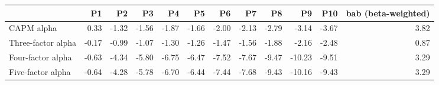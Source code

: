 \begin{tabular}{lrrrrrrrrrrr}
\toprule
{} &    P1 &    P2 &    P3 &    P4 &    P5 &    P6 &    P7 &    P8 &     P9 &   P10 &  bab (beta-weighted) \\
\midrule
CAPM alpha         &  0.33 & -1.32 & -1.56 & -1.87 & -1.66 & -2.00 & -2.13 & -2.79 &  -3.14 & -3.67 &                 3.82 \\
Three-factor alpha & -0.17 & -0.99 & -1.07 & -1.30 & -1.26 & -1.47 & -1.56 & -1.88 &  -2.16 & -2.48 &                 0.87 \\
Four-factor alpha  & -0.63 & -4.34 & -5.80 & -6.75 & -6.47 & -7.52 & -7.67 & -9.47 & -10.23 & -9.51 &                 3.29 \\
Five-factor alpha  & -0.64 & -4.28 & -5.78 & -6.70 & -6.44 & -7.44 & -7.68 & -9.43 & -10.16 & -9.43 &                 3.29 \\
\bottomrule
\end{tabular}
